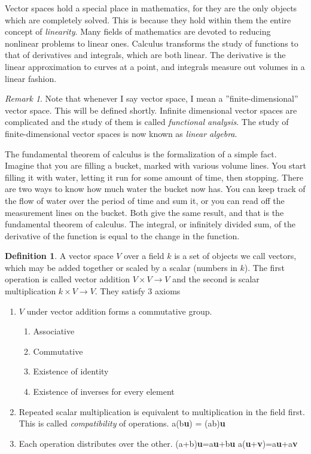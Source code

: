 \documentclass[12pt]{article}
\theoremstyle{definition}
\newtheorem{definition}{Definition}[section]
\theoremstyle{remark}
\newtheorem*{remark}{Remark}
\theoremstyle{example}
\def\b#1{\textbf{#1}}
\begin{document}
Vector spaces hold a special place in mathematics, for they are the only objects which are completely solved. This is because they hold within them the entire concept of \textit{linearity}. Many fields of mathematics are devoted to reducing nonlinear problems to linear ones. Calculus transforms the study of functions to that of derivatives and integrals, which are both linear. The derivative is the linear approximation to curves at a point, and integrals measure out volumes in a linear fashion.

\begin{remark}
	Note that whenever I say vector space, I mean a ''finite-dimensional'' vector space. This will be defined shortly. Infinite dimensional vector spaces are complicated and the study of them is called \textit{functional analysis}. The study of finite-dimensional vector spaces is now known as \textit{linear algebra}.
\end{remark}

The fundamental theorem of calculus is the formalization of a simple fact. Imagine that you are filling a bucket, marked with various volume lines. You start filling it with water, letting it run for some amount of time, then stopping. There are two ways to know how much water the bucket now has. You can keep track of the flow of water over the period of time and sum it, or you can read off the measurement lines on the bucket. Both give the same result, and that is the fundamental theorem of calculus. The integral, or infinitely divided sum, of the derivative of the function is equal to the change in the function.


\begin{definition}
	A vector space $V$ over a field $k$ is a set of objects we call vectors, which may be added together or scaled by a scalar (numbers in $k$). The first operation is called vector addition $V\times V\to V$ and the second is scalar multiplication $k\times V\to V$. They satisfy 3 axioms
	
	\begin{enumerate}
		\item $V$ under vector addition forms a commutative group.
		\begin{enumerate}
			\item Associative
			\item Commutative
			\item Existence of identity
			\item Existence of inverses for every element
		\end{enumerate}
		\item Repeated scalar multiplication is equivalent to multiplication in the field first. This is called \textit{compatibility} of operations.
		\subitem a(b\b{u}) = (ab)\b{u}
		\item Each operation distributes over the other.
		\subitem (a+b)\b{u}=a\b{u}+b\b{u}
		\subitem a(\b{u}+\b{v})=a\b{u}+a\b{v}
	\end{enumerate}
\end{definition}
\end{document}
